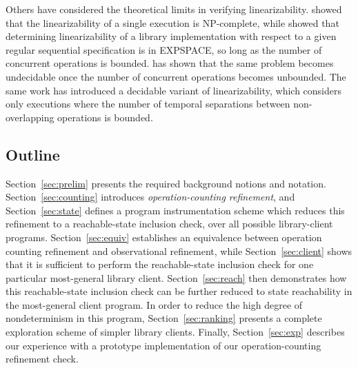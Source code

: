 Others have considered the theoretical limits in verifying linearizability.
\citet{journals/siamcomp/GibbonsK97} showed that the linearizability of a
single execution is NP-complete, while \citet{journals/iandc/AlurMP00} showed
that determining linearizability of a library implementation with respect to a
given regular sequential specification is in EXPSPACE, so long as the number of
concurrent operations is bounded. \citet{conf/esop/BouajjaniEEH13} has shown that the same
problem becomes undecidable once the number of concurrent operations becomes
unbounded. The same work has introduced a decidable variant of linearizability, which
considers only executions where the number of temporal separations between non-overlapping 
operations is bounded.
%

\subsection{Outline}
\label{sec:outline}

Section~\ref{sec:prelim} presents the required background notions and notation.
Section~\ref{sec:counting} introduces \emph{operation-counting refinement}, and
Section~\ref{sec:state} defines a program instrumentation scheme which reduces this refinement to a
reachable-state inclusion check, over all possible library-client programs.
Section~\ref{sec:equiv} establishes an equivalence between operation counting
refinement and observational refinement, while Section~\ref{sec:client} shows
that it is sufficient to perform the reachable-state inclusion check for one
particular most-general library client. Section~\ref{sec:reach} then
demonstrates how this reachable-state inclusion check can be further reduced to
state reachability in the most-general client program. In order to reduce
the high degree of nondeterminism in this program, Section~\ref{sec:ranking} presents
a complete exploration scheme of simpler library clients.
Finally,
Section~\ref{sec:exp} describes our experience with a prototype implementation
of our operation-counting refinement check.
